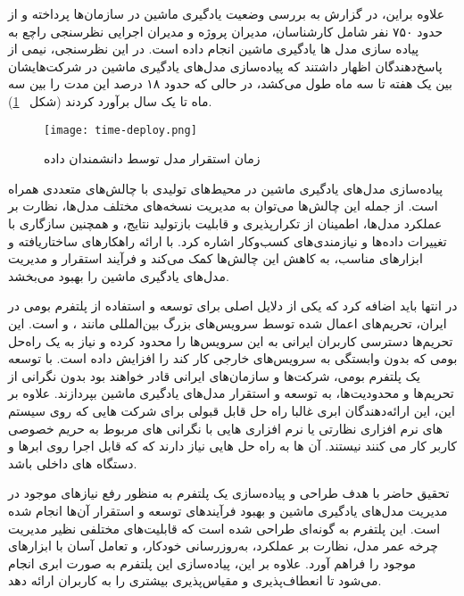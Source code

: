علاوه براین، در گزارش \cite{algorithmiaMLState} به بررسی وضعیت یادگیری ماشین در سازمان‌ها پرداخته و از  حدود ۷۵۰ نفر شامل کارشناسان، مدیران پروژه و مدیران اجرایی نظرسنجی راچع به پیاده سازی مدل ها یادگیری ماشین انجام داده است. در این نظرسنجی، نیمی از پاسخ‌دهندگان اظهار داشتند که پیاده‌سازی مدل‌های یادگیری ماشین در شرکت‌هایشان بین یک هفته تا سه ماه طول می‌کشد، در حالی که حدود ۱۸ درصد این مدت را بین سه ماه تا یک سال برآورد کردند (شکل ~\ref{fig: time deploy}). 

\begin{figure}[!t]
	\centering
	\texttt{[image: time-deploy.png]}
	\caption{زمان استقرار مدل توسط دانشمندان داده}
	\label{fig: time deploy}
\end{figure}


پیاده‌سازی مدل‌های یادگیری ماشین در محیط‌های تولیدی با چالش‌های متعددی همراه است. از جمله این چالش‌ها می‌توان به مدیریت نسخه‌های مختلف مدل‌ها، نظارت بر عملکرد مدل‌ها، اطمینان از تکرارپذیری و قابلیت بازتولید نتایج، و همچنین سازگاری با تغییرات داده‌ها و نیازمندی‌های کسب‌وکار اشاره کرد.  با ارائه راهکارهای ساختاریافته و ابزارهای مناسب، به کاهش این چالش‌ها کمک می‌کند و فرآیند استقرار و مدیریت مدل‌های یادگیری ماشین را بهبود می‌بخشد.


در انتها باید اضافه کرد که یکی از دلایل اصلی برای توسعه و استفاده از پلتفرم بومی  در ایران، تحریم‌های اعمال شده توسط سرویس‌های بزرگ بین‌المللی مانند
 ،
   و  است. این تحریم‌ها دسترسی کاربران ایرانی به این سرویس‌ها را محدود کرده و نیاز به یک راه‌حل بومی که بدون وابستگی به سرویس‌های خارجی کار کند را افزایش داده است. با توسعه یک پلتفرم بومی، شرکت‌ها و سازمان‌های ایرانی قادر خواهند بود بدون نگرانی از تحریم‌ها و محدودیت‌ها، به توسعه و استقرار مدل‌های یادگیری ماشین بپردازند. علاوه بر این،‌
  این ارائه‌دهندگان ابری غالبا راه حل قابل قبولی برای شرکت هایی که روی سیستم های نرم افزاری نظارتی یا نرم افزاری هایی با نگرانی های مربوط به حریم خصوصی کاربر کار می کنند نیستند. آن ها به راه حل هایی نیاز دارند که که قابل اجرا روی ابرها و دستگاه های داخلی باشد.
  
  تحقیق حاضر با هدف طراحی و پیاده‌سازی یک پلتفرم  به منظور رفع نیازهای موجود در مدیریت مدل‌های یادگیری ماشین و بهبود فرآیندهای توسعه و استقرار آن‌ها انجام شده است. این پلتفرم به گونه‌ای طراحی شده است که قابلیت‌های مختلفی نظیر مدیریت چرخه عمر مدل، نظارت بر عملکرد، به‌روزرسانی خودکار، و تعامل آسان با ابزارهای موجود را فراهم آورد. علاوه بر این، پیاده‌سازی این پلتفرم به صورت ابری انجام می‌شود تا انعطاف‌پذیری و مقیاس‌پذیری بیشتری را به کاربران ارائه دهد.
  
